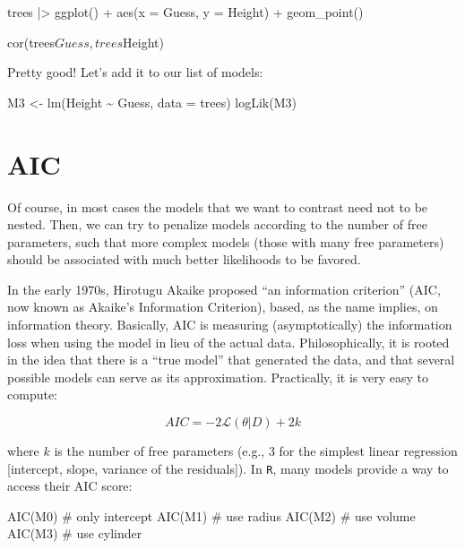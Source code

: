 \documentclass[
  letterpaper,
  DIV=11,
  numbers=noendperiod]{scrreprt}
\newenvironment{Shaded}{\begin{snugshade}}{\end{snugshade}}
\newcommand{\NormalTok}[1]{\textcolor[rgb]{0.00,0.23,0.31}{#1}}
\begin{document}
\begin{Shaded}
\begin{Highlighting}[]
\NormalTok{trees |\textgreater{} ggplot() + aes(x = Guess, y = Height) + geom\_point()}
\end{Highlighting}
\end{Shaded}

\begin{Shaded}
\begin{Highlighting}[]
\NormalTok{cor(trees$Guess, trees$Height)}
\end{Highlighting}
\end{Shaded}

Pretty good! Let's add it to our list of models:

\begin{Shaded}
\begin{Highlighting}[]
\NormalTok{M3 \textless{}{-} lm(Height \textasciitilde{} Guess, data = trees)}
\NormalTok{logLik(M3)}
\end{Highlighting}
\end{Shaded}

\section{AIC}\label{aic}

Of course, in most cases the models that we want to contrast need not to
be nested. Then, we can try to penalize models according to the number
of free parameters, such that more complex models (those with many free
parameters) should be associated with much better likelihoods to be
favored.

In the early 1970s, Hirotugu Akaike proposed ``an information
criterion'' (AIC, now known as Akaike's Information Criterion), based,
as the name implies, on information theory. Basically, AIC is measuring
(asymptotically) the information loss when using the model in lieu of
the actual data. Philosophically, it is rooted in the idea that there is
a ``true model'' that generated the data, and that several possible
models can serve as its approximation. Practically, it is very easy to
compute:

\[AIC = -2 \mathcal L(\theta \vert D) + 2 k\]

where \(k\) is the number of free parameters (e.g., 3 for the simplest
linear regression {[}intercept, slope, variance of the residuals{]}). In
\texttt{R}, many models provide a way to access their AIC score:

\begin{Shaded}
\begin{Highlighting}[]
\NormalTok{AIC(M0) \# only intercept}
\NormalTok{AIC(M1) \# use radius}
\NormalTok{AIC(M2) \# use volume}
\NormalTok{AIC(M3) \# use cylinder}
\end{Highlighting}
\end{Shaded}
\end{document}
